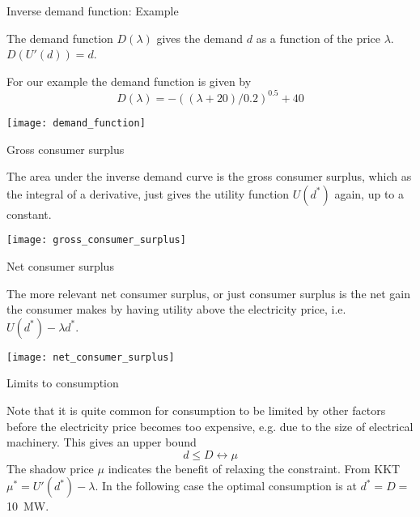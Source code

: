 \documentclass[10pt,aspectratio=169,dvipsnames]{beamer}
\def\l{\lambda}
\def\m{\mu}
\begin{document}
\begin{frame}{Inverse demand function: Example}


  The \alert{demand function} $D(\l)$ gives the demand $d$ as a function of the price $\l$. $D(U'(d)) = d$.

  For our example the demand function is given by
  \begin{equation*}
    D(\l) =  -((\l+20 )/0.2)^{0.5} +40
  \end{equation*}

  \centering
  \texttt{[image: demand\_function]}

\end{frame}



\begin{frame}{Gross consumer surplus}

  The area under the inverse demand curve is the \alert{gross consumer surplus},
  which as the integral of a derivative, just gives the utility
  function $U(d^*)$ again, up to a constant.

  \centering
  \texttt{[image: gross\_consumer\_surplus]}

\end{frame}



\begin{frame}{Net consumer surplus}

  The more relevant \alert{net consumer surplus}, or just
  \alert{consumer surplus} is the net gain the consumer makes by
  having utility above the electricity price, i.e. $U(d^*) - \l d^*$.

  \centering
  \texttt{[image: net\_consumer\_surplus]}

\end{frame}


\begin{frame}{Limits to consumption}


  Note that it is quite common for consumption to be limited by other
  factors before the electricity price becomes too expensive, e.g. due
  to the size of electrical machinery. This gives an upper bound
  \begin{equation*}
    d \leq D  \leftrightarrow \m
  \end{equation*}
  The \alert{shadow price} $\m$ indicates the benefit of relaxing the constraint. From KKT $\m^* = U'(d^*) - \l$.
  In the following case the optimal consumption is at
  $d^* = D =$  10~MW.

    \centering


\end{frame}
\end{document}
